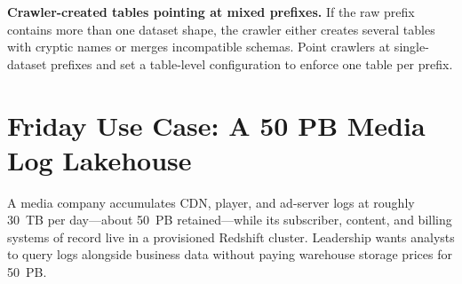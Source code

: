 \begin{pitfall}
\textbf{Crawler-created tables pointing at mixed prefixes.} If the raw prefix contains more than one dataset shape, the crawler either creates several tables with cryptic names or merges incompatible schemas. Point crawlers at single-dataset prefixes and set a table-level configuration to enforce one table per prefix.
\end{pitfall}

\section{Friday Use Case: A 50 PB Media Log Lakehouse}
A media company accumulates CDN, player, and ad-server logs at roughly 30~TB per day---about 50~PB retained---while its subscriber, content, and billing systems of record live in a provisioned Redshift cluster. Leadership wants analysts to query logs alongside business data without paying warehouse storage prices for 50~PB.

